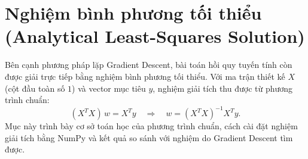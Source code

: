 \documentclass[12pt,a4paper]{article}
\begin{document}






\section{Nghiệm bình phương tối thiểu (Analytical Least-Squares Solution)}
\label{sec:least-squares}

Bên cạnh phương pháp lặp Gradient Descent, bài toán hồi quy
tuyến tính còn được giải trực tiếp bằng nghiệm bình phương
tối thiểu. Với ma trận thiết kế $X$ (cột đầu toàn số $1$) và
vector mục tiêu $y$, nghiệm giải tích thu được từ phương
trình chuẩn:
\[
    (X^{T}X)\,w = X^{T}y
    \quad\Longrightarrow\quad
    w = (X^{T}X)^{-1}X^{T}y .
\]
Mục này trình bày cơ sở toán học của phương trình chuẩn,
cách cài đặt nghiệm giải tích bằng NumPy và kết quả so sánh
với nghiệm do Gradient Descent tìm được.
\end{document}
